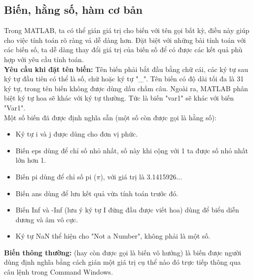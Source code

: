 \documentclass[12pt,a4paper]{article}
\begin{document}
\subsection{Biến, hằng số, hàm cơ bản}
Trong MATLAB, ta có thể gián giá trị cho biến với tên gọi bất kỳ, điều này giúp cho việc tính toán rõ ràng vả dễ dàng hơn. Đặt biệt với những bài tính toán với các biến số, ta dễ dàng thay đổi giá trị của biến số để có được các kết quả phù hợp với yêu cầu tính toán.\\
\textbf{Yêu cầu khi đặt tên biến:} Tên biến phải bắt đầu bằng chữ cái, các ký tự sau ký tự đầu tiên có thể là số, chữ hoặc ký tự "\_". Tên biến có độ dài tối đa là 31 ký tự, trong tên biến không được dùng dấu chấm câu. Ngoài ra, MATLAB phân biệt ký tự hoa sẽ khác với ký tự thường. Tức là biến "var1" sẽ khác với biến "Var1".\\
Một số biến đã được định nghĩa sẵn (một số còn được gọi là hằng số):
\begin{itemize}
	\item Ký tự i và j được dùng cho đơn vị phức.
	\item Biến eps dùng để chỉ số nhỏ nhất, số này khi cộng với 1 ta được số nhỏ nhất lớn hơn 1.
	\item Biến pi dùng để chỉ số pi ($\pi$), với giá trị là 3.1415926...
	\item Biến ans dùng để lưu kết quả vừa tính toán trước đó.
	\item Biến Inf và -Inf (lưu ý ký tự I đứng đầu được viết hoa) dùng để biểu diễn dương và âm vô cực.
	\item Ký tự NaN thể hiện cho "Not a Number", không phải là một số.
\end{itemize}
\textbf{Biến thông thường:} (hay còn được gọi là biến vô hướng) là biến được người dùng định nghĩa bằng cách gián một giá trị cụ thể nào đó trực tiếp thông qua câu lệnh trong Command Windows.
\end{document}
